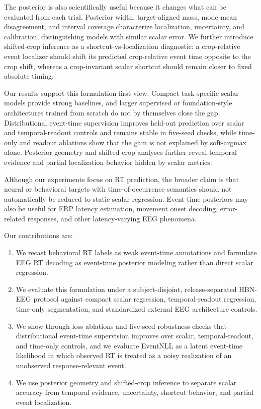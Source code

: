 \documentclass[12pt]{article}
\begin{document}
The posterior is also scientifically useful because it changes what can be evaluated from each trial. Posterior width, target-aligned mass, mode-mean disagreement, and interval coverage characterize localization, uncertainty, and calibration, distinguishing models with similar scalar error. We further introduce shifted-crop inference as a shortcut-vs-localization diagnostic: a crop-relative event localizer should shift its predicted crop-relative event time opposite to the crop shift, whereas a crop-invariant scalar shortcut should remain closer to fixed absolute timing.

Our results support this formulation-first view. Compact task-specific scalar models provide strong baselines, and larger supervised or foundation-style architectures trained from scratch do not by themselves close the gap. Distributional event-time supervision improves held-out prediction over scalar and temporal-readout controls and remains stable in five-seed checks, while time-only and readout ablations show that the gain is not explained by soft-argmax alone. Posterior-geometry and shifted-crop analyses further reveal temporal evidence and partial localization behavior hidden by scalar metrics.

Although our experiments focus on RT prediction, the broader claim is that neural or behavioral targets with time-of-occurrence semantics should not automatically be reduced to static scalar regression. Event-time posteriors may also be useful for ERP latency estimation, movement onset decoding, error-related responses, and other latency-varying EEG phenomena.

Our contributions are:
\begin{enumerate}
    \item We recast behavioral RT labels as weak event-time annotations and formulate EEG RT decoding as event-time posterior modeling rather than direct scalar regression.
    \item We evaluate this formulation under a subject-disjoint, release-separated HBN-EEG protocol against compact scalar regression, temporal-readout regression, time-only segmentation, and standardized external EEG architecture controls.
    \item We show through loss ablations and five-seed robustness checks that distributional event-time supervision improves over scalar, temporal-readout, and time-only controls, and we evaluate EventNLL as a latent event-time likelihood in which observed RT is treated as a noisy realization of an unobserved response-relevant event.
    \item We use posterior geometry and shifted-crop inference to separate scalar accuracy from temporal evidence, uncertainty, shortcut behavior, and partial event localization.
\end{enumerate}
\end{document}
